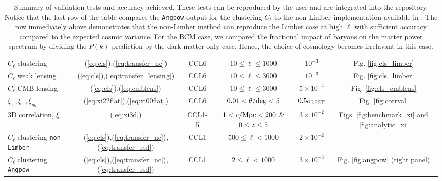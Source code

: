 \begin{sidewaystable*}[!htp]
\begin{tabular}{ l|c c c c c}
    $C_\ell$ clustering & (\ref{eq:cls}),(\ref{eq:transfer_nc})& CCL6 &$10 \leq \ell\leq 1000$ &  $10^{-3}$ & Fig. \ref{fig:cls_limber}\\
    $C_\ell$ weak lensing & (\ref{eq:cls}),(\ref{eq:transfer_lensing})& CCL6 &$10 \leq \ell\leq 3000$ &  $10^{-3}$ & Fig. \ref{fig:cls_limber}\\
    $C_\ell$ CMB lensing &(\ref{eq:cls}),(\ref{eq:cmblens}) & CCL6 & $10 \leq \ell\leq 3000$& $5\times 10^{-4}$ & Fig. \ref{fig:cls_cmblens}\\
    $\xi_+,\xi_-,\xi_{gg}$ & (\ref{eq:xi22flat}),(\ref{eq:xi00flat}) & CCL6 & $0.01< \theta/{\rm deg}< 5$&  $0.5\sigma_{\rm LSST}$ & Fig. \ref{fig:corrval}\\
    3D correlation, $\xi$ & (\ref{eq:xi3d}) & CCL1-5 & $1<r/{\rm Mpc}<200$ \& $0 \leq z \leq 5$& $3\times 10^{-2}$ & Figs. \ref{fig:benchmark_xi} and \ref{fig:analytic_xi} \\
    $C_\ell$ clustering {\tt non-Limber} &  (\ref{eq:cls}),(\ref{eq:transfer_nc}),(\ref{eq:transfer_rsd}) & CCL1 & $500 \leq \ell < 1000$ & $2\times 10^{-2}$ & - \\
    $C_\ell$ clustering {\tt Angpow} & (\ref{eq:cls}),(\ref{eq:transfer_nc}),(\ref{eq:transfer_rsd}) & CCL1 & $2 \leq \ell < 1000$ & $3\times 10^{-3}$  & Fig. \ref{fig:angpow} (right panel)\\
    \hline
  \end{tabular}
  \caption{Summary of \ccl validation tests and accuracy achieved. These tests can be reproduced by the user and are integrated into the \ccl repository. Notice that the last row of the table compares the {\tt Angpow} output for the clustering $C_\ell$ to the non-Limber implementation available in \ccl. The row immediately above demonstrates that the non-Limber method can reproduce the Limber case at high $\ell$ with sufficient accuracy compared to the expected cosmic variance. For the BCM case, we compared the fractional impact of baryons on the matter power spectrum by dividing the $P(k)$ prediction by the dark-matter-only case. Hence, the choice of cosmology becomes irrelavant in this case.}
  \label{tab:tests}
\end{sidewaystable*}
